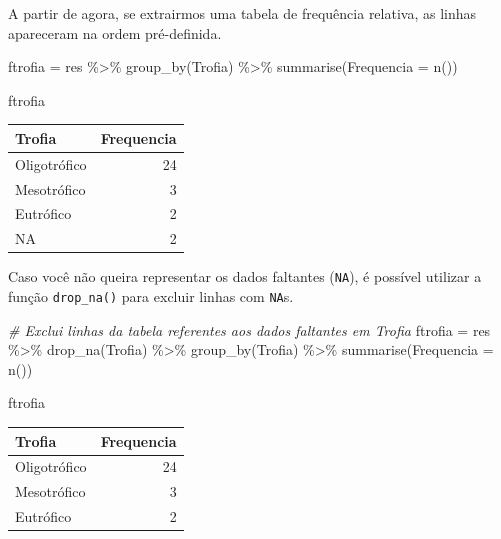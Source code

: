 \documentclass[
]{book}
\newenvironment{Shaded}{\begin{snugshade}}{\end{snugshade}}
\newcommand{\AttributeTok}[1]{\textcolor[rgb]{0.77,0.63,0.00}{#1}}
\newcommand{\CommentTok}[1]{\textcolor[rgb]{0.56,0.35,0.01}{\textit{#1}}}
\newcommand{\FunctionTok}[1]{\textcolor[rgb]{0.00,0.00,0.00}{#1}}
\newcommand{\NormalTok}[1]{#1}
\newcommand{\OtherTok}[1]{\textcolor[rgb]{0.56,0.35,0.01}{#1}}
\newcommand{\SpecialCharTok}[1]{\textcolor[rgb]{0.00,0.00,0.00}{#1}}
\begin{document}
A partir de agora, se extrairmos uma tabela de frequência relativa, as linhas apareceram na ordem pré-definida.

\begin{Shaded}
\begin{Highlighting}[]
\NormalTok{ftrofia }\OtherTok{=}\NormalTok{ res }\SpecialCharTok{\%\textgreater{}\%} 
  \FunctionTok{group\_by}\NormalTok{(Trofia) }\SpecialCharTok{\%\textgreater{}\%} 
  \FunctionTok{summarise}\NormalTok{(}\AttributeTok{Frequencia =} \FunctionTok{n}\NormalTok{())}

\NormalTok{ftrofia}
\end{Highlighting}
\end{Shaded}

\begin{tabular}{l|r}
\hline
Trofia & Frequencia\\
\hline
Oligotrófico & 24\\
\hline
Mesotrófico & 3\\
\hline
Eutrófico & 2\\
\hline
NA & 2\\
\hline
\end{tabular}

Caso você não queira representar os dados faltantes (\texttt{NA}), é possível utilizar a função \texttt{drop\_na()} para excluir linhas com \texttt{NA}s.

\begin{Shaded}
\begin{Highlighting}[]
\CommentTok{\# Exclui linhas da tabela referentes aos dados faltantes em \textasciigrave{}Trofia\textasciigrave{}}
\NormalTok{ftrofia }\OtherTok{=}\NormalTok{ res }\SpecialCharTok{\%\textgreater{}\%} 
  \FunctionTok{drop\_na}\NormalTok{(Trofia) }\SpecialCharTok{\%\textgreater{}\%} 
  \FunctionTok{group\_by}\NormalTok{(Trofia) }\SpecialCharTok{\%\textgreater{}\%} 
  \FunctionTok{summarise}\NormalTok{(}\AttributeTok{Frequencia =} \FunctionTok{n}\NormalTok{())}

\NormalTok{ftrofia}
\end{Highlighting}
\end{Shaded}

\begin{tabular}{l|r}
\hline
Trofia & Frequencia\\
\hline
Oligotrófico & 24\\
\hline
Mesotrófico & 3\\
\hline
Eutrófico & 2\\
\hline
\end{tabular}
\end{document}
